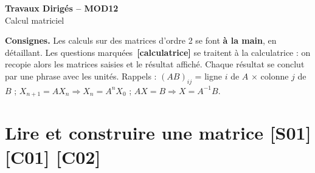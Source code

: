 \documentclass[a4paper,11pt]{article}
\newcommand{\calc}{\,{\color{uimmred}\small\textbf{[calculatrice]}}}
\begin{document}
\begin{tcolorbox}[colback=uimmblue, colframe=uimmblue, sharp corners, boxrule=0pt,
  left=14pt, right=14pt, top=10pt, bottom=10pt]
{\color{white}\LARGE\bfseries Travaux Dirigés -- MOD12}\\[4pt]
{\color{white}\large Calcul matriciel}
\end{tcolorbox}

\vspace{2pt}

\begin{consigne}
\textbf{Consignes.} Les calculs sur des matrices d'ordre 2 se font \textbf{à la main}, en détaillant. Les questions marquées \calc{} se traitent à la calculatrice : on recopie alors les matrices saisies et le résultat affiché. Chaque résultat se conclut par une phrase avec les unités. Rappels : $(AB)_{ij}$ = ligne $i$ de $A$ $\times$ colonne $j$ de $B$ ; $X_{n+1}=AX_n \Rightarrow X_n = A^nX_0$ ; $AX=B \Rightarrow X = A^{-1}B$.
\end{consigne}

\needspace{7cm}
\section{Lire et construire une matrice \hfill {\normalsize\color{uimmred}[S01] [C01] [C02]}}
\end{document}
